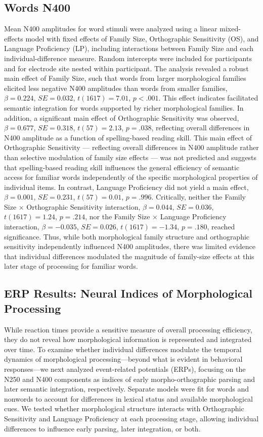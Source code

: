 \subsection*{Words N400}
Mean N400 amplitudes for word stimuli were analyzed using a linear mixed-effects model with fixed effects of Family Size, Orthographic Sensitivity (OS), and Language Proficiency (LP), including interactions between Family Size and each individual-difference measure. Random intercepts were included for participants and for electrode site nested within participant. The analysis revealed a robust main effect of Family Size, such that words from larger morphological families elicited less negative N400 amplitudes than words from smaller families, $\beta = 0.224$, $SE = 0.032$, $t(1617) = 7.01$, $p < .001$. This effect indicates facilitated semantic integration for words supported by richer morphological families. In addition, a significant main effect of Orthographic Sensitivity was observed, $\beta = 0.677$, $SE = 0.318$, $t(57) = 2.13$, $p = .038$, reflecting overall differences in N400 amplitude as a function of spelling-based reading skill. This main effect of Orthographic Sensitivity — reflecting overall differences in N400 amplitude rather than selective modulation of family size effects — was not predicted and suggests that spelling-based reading skill influences the general efficiency of semantic access for familiar words independently of the specific morphological properties of individual items. In contrast, Language Proficiency did not yield a main effect, $\beta = 0.001$, $SE = 0.231$, $t(57) = 0.01$, $p = .996$. Critically, neither the Family Size × Orthographic Sensitivity interaction, $\beta = 0.044$, $SE = 0.036$, $t(1617) = 1.24$, $p = .214$, nor the Family Size × Language Proficiency interaction, $\beta = -0.035$, $SE = 0.026$, $t(1617) = -1.34$, $p = .180$, reached significance. Thus, while both morphological family structure and orthographic sensitivity independently influenced N400 amplitudes, there was limited evidence that individual differences modulated the magnitude of family-size effects at this later stage of processing for familiar words.



\subsection{ERP Results: Neural Indices of Morphological Processing}
While reaction times provide a sensitive measure of overall processing efficiency, they do not reveal how morphological information is represented and integrated over time. To examine whether individual differences modulate the temporal dynamics of morphological processing—beyond what is evident in behavioral responses—we next analyzed event-related potentials (ERPs), focusing on the N250 and N400 components as indices of early morpho-orthographic parsing and later semantic integration, respectively. Separate models were fit for words and nonwords to account for differences in lexical status and available morphological cues. We tested whether morphological structure interacts with Orthographic Sensitivity and Language Proficiency at each processing stage, allowing individual differences to influence early parsing, later integration, or both.

